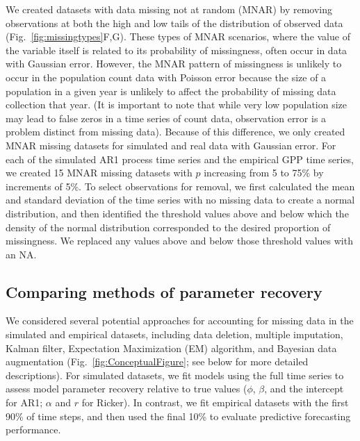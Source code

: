 \documentclass{article}
\begin{document}
We created datasets with data missing not at random (MNAR) by removing observations at both the high and low tails of the distribution of observed data (Fig.\ \ref{fig:missingtypes}F,G). These types of MNAR scenarios, where the value of the variable itself is related to its probability of missingness, often occur in data with Gaussian error. However, the MNAR pattern of missingness is unlikely to occur in the population count data with Poisson error because the size of a population in a given year is unlikely to affect the probability of missing data collection that year. (It is important to note that while very low population size may lead to false zeros in a time series of count data, observation error is a problem distinct from missing data). Because of this difference, we only created MNAR missing datasets for simulated and real data with Gaussian error. For each of the simulated AR1 process time series and the empirical GPP time series, we created 15 MNAR missing datasets with $p$ increasing from 5 to 75\% by increments of 5\%. To select observations for removal, we first calculated the mean and standard deviation of the time series with no missing data to create a normal distribution, and then identified the threshold values above and below which the density of the normal distribution corresponded to the desired proportion of missingness. We replaced any values above and below those threshold values with an NA.



\subsection*{Comparing methods of parameter recovery}
We considered several potential approaches for accounting for missing data in the simulated and empirical datasets, including data deletion, multiple imputation, Kalman filter, Expectation Maximization (EM) algorithm, and Bayesian data augmentation (Fig.\ \ref{fig:ConceptualFigure}; see below for more detailed descriptions). For simulated datasets, we fit models using the full time series to assess model parameter recovery relative to true values ($\phi$, $\beta$, and the intercept for AR1; $\alpha$ and $r$ for Ricker). In contrast, we fit empirical datasets with the first 90\% of time steps, and then used the final 10\% to evaluate predictive forecasting performance. 
\end{document}
